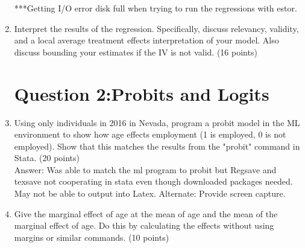 \documentclass{article}
\begin{document}
\begin{enumerate}[label=\alph*]
***Getting I/O error disk full when trying to run the regressions with estor. 



\item Interpret the results of the regression. Specifically, discuss relevancy, validity,
and a local average treatment effects interpretation of your model. Also discuss
bounding your estimates if the IV is not valid. (16 points)\\

\section{Question 2:Probits and Logits} 


\item 

Using only individuals in 2016 in Nevada, program a probit model in the ML
environment to show how age effects employment (1 is employed, 0 is not employed). Show that this matches the results from the "probit" command in Stata.
(20 points)\\

Answer: Was able to match the ml program to probit but Regsave and texsave not cooperating in stata even though downloaded packages needed. May not be able to output into Latex. Alternate: Provide screen capture. 

\item  

Give the marginal effect of age at the mean of age and the mean of the marginal
effect of age. Do this by calculating the effects without using margins or similar
commands. (10 points)\\



\end{enumerate}
\end{document}
